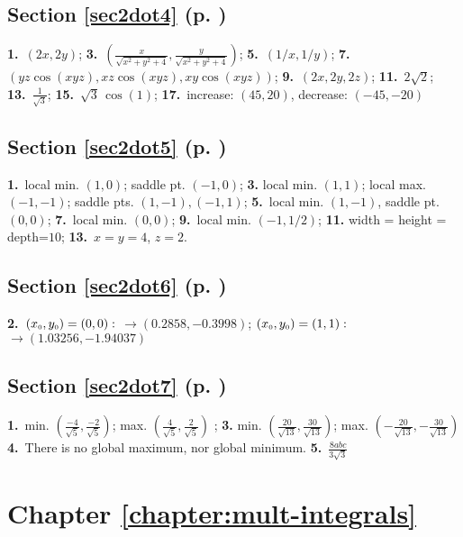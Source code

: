 \begin{multicols}{2}
\subsection*{Section \ref{sec2dot4} (p. \pageref{sec2dot4})}

\textbf{1.}~$(2x,2y)$;\quad
\textbf{3.}~$(\frac{x}{\sqrt{x^2 + y^2 + 4}},\frac{y}{\sqrt{x^2 + y^2 + 4}})$;\quad
\textbf{5.}~$(1/x,1/y)$;\quad
\textbf{7.}~$(yz\cos(xyz),xz\cos(xyz),xy\cos(xyz))$; \quad
\textbf{9.}~$(2x,2y,2z)$;\quad
\textbf{11.}~$2\sqrt{2}$;\quad
\textbf{13.}~$\frac{1}{\sqrt{3}}$;\quad
\textbf{15.}~$\sqrt{3}\,\cos(1)$;\quad
\textbf{17.}~increase: $(45,20)$, decrease: $(-45,-20)$

\subsection*{Section \ref{sec2dot5} (p. \pageref{sec2dot5})}

\textbf{1.}~local min. $(1,0)$; saddle pt. $(-1,0)$; \quad\textbf{3.}
local min. $(1,1)$; local max. $(-1,-1)$; saddle pts. $(1,-1),(-1,1)$;\quad
\textbf{5.}~local min. $(1,-1)$, saddle pt. $(0,0)$;\quad
\textbf{7.}~local min. $(0,0)$;\quad
\textbf{9.}~local min. $(-1,1/2)$;\quad
\textbf{11.}
width = height = depth=$10$;\quad
\textbf{13.}~$x=y=4$, $z=2$.

\subsection*{Section \ref{sec2dot6} (p. \pageref{sec2dot6})}

\textbf{2.}~$(x_{\scriptscriptstyle 0},y_{\scriptscriptstyle 0})=(0,0):$ $\rightarrow (0.2858,-0.3998)$;
$(x_{\scriptscriptstyle 0},y_{\scriptscriptstyle 0})=(1,1):$ $\rightarrow (1.03256,-1.94037)$
\subsection*{Section \ref{sec2dot7} (p. \pageref{sec2dot7})}

\textbf{1.}~min. $\left(\frac{-4}{\sqrt{5}},\frac{-2}{\sqrt{5}}\right)$;
max. $\left(\frac{4}{\sqrt{5}},\frac{2}{\sqrt{5}}\right)$
; \quad
\textbf{3.}
min. $\left(\frac{20}{\sqrt{13}},\frac{30}{\sqrt{13}}\right)$;
max. $\left(-\frac{20}{\sqrt{13}},-\frac{30}{\sqrt{13}}\right)$
\textbf{4.}~There is no global maximum, nor global minimum.
\textbf{5.}~$\frac{8abc}{3\sqrt{3}}$
\section*{Chapter \ref{chapter:mult-integrals}}

\end{multicols}
